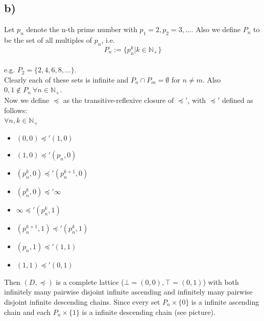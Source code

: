 \documentclass[fleqn,12pt]{article}
\begin{document}
\subsection*{b)}
Let $p_n$ denote the n-th prime number with $p_1=2, p_2=3, \dots$.
Also we define $P_n$ to be the set of all multiples of $p_n$, i.e. $$P_n := \{p_n^k | k \in \mathbb{N}_+\}$$\\
e.g. $P_2 = \{2,4,6,8,\dots \}$.\\
Clearly each of these sets is infinite and $P_n \cap P_m = \emptyset$ for $n\neq m$. Also $0,1 \not \in P_n \ \forall n \in \mathbb{N}_+$.\\
Now we define $\preceq$ as the transitive-reflexive closure of $\preceq'$, with $\preceq'$ defined as follows:\\
$\forall n,k\in \mathbb{N}_+$
\begin{itemize}
\item $(0,0) \preceq' (1,0)$
\item $(1,0) \preceq' (p_n,0)$
\item $(p_n^k,0) \preceq' (p_n^{k+1},0)$
\item $(p_n^k,0) \preceq' \infty$

\item $\infty \preceq' (p_n^k,1)$
\item $(p_n^{k+1},1) \preceq' (p_n^k,1)$
\item $(p_n,1) \preceq' (1,1)$
\item $(1,1) \preceq' (0,1)$
\end{itemize}
Then $(D,\preceq)$ is a complete lattice ($\bot=(0,0),\top=(0,1)$) with both infinitely many
pairwise disjoint infinite ascending and infinitely many pairwise disjoint infinite descending chains.
Since every set $P_n \times \{0\}$ is a infinite ascending chain and each $P_n \times \{1\}$ is a infinite descending chain (see picture).
\end{document}
